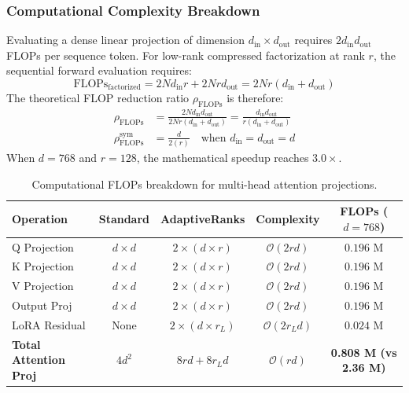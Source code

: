 \subsubsection{Computational Complexity Breakdown}
Evaluating a dense linear projection of dimension $d_{\text{in}} \times d_{\text{out}}$ requires $2 d_{\text{in}} d_{\text{out}}$ FLOPs per sequence token. For low-rank compressed factorization at rank $r$, the sequential forward evaluation requires:
\begin{equation}
\text{FLOPs}_{\text{factorized}} = 2 N d_{\text{in}} r + 2 N r d_{\text{out}} = 2 N r (d_{\text{in}} + d_{\text{out}})
\end{equation}
The theoretical FLOP reduction ratio $\rho_{\text{FLOPs}}$ is therefore:
\begin{align}
\rho_{\text{FLOPs}} &= \frac{2 N d_{\text{in}} d_{\text{out}}}{2 N r (d_{\text{in}} + d_{\text{out}})} = \frac{d_{\text{in}} d_{\text{out}}}{r (d_{\text{in}} + d_{\text{out}})} \\
\rho_{\text{FLOPs}}^{\text{sym}} &= \frac{d}{2(r)} \quad \text{when } d_{\text{in}} = d_{\text{out}} = d
\end{align}
When $d = 768$ and $r = 128$, the mathematical speedup reaches $3.0\times$.

\begin{table}[H]
\centering
\small
\begin{tabular}{lcccc}
\toprule
\textbf{Operation} & \textbf{Standard} & \textbf{AdaptiveRanks} & \textbf{Complexity} & \textbf{FLOPs ($d=768$)} \\
\midrule
Q Projection & $d \times d$ & $2 \times (d \times r)$ & $\mathcal{O}(2rd)$ & $0.196$ M \\
K Projection & $d \times d$ & $2 \times (d \times r)$ & $\mathcal{O}(2rd)$ & $0.196$ M \\
V Projection & $d \times d$ & $2 \times (d \times r)$ & $\mathcal{O}(2rd)$ & $0.196$ M \\
Output Proj & $d \times d$ & $2 \times (d \times r)$ & $\mathcal{O}(2rd)$ & $0.196$ M \\
LoRA Residual & None & $2 \times (d \times r_L)$ & $\mathcal{O}(2r_L d)$ & $0.024$ M \\
\midrule
\textbf{Total Attention Proj} & $4 d^2$ & $8rd + 8r_L d$ & $\mathcal{O}(rd)$ & \textbf{0.808 M (vs 2.36 M)} \\
\bottomrule
\end{tabular}
\caption{Computational FLOPs breakdown for multi-head attention projections.}
\end{table}

